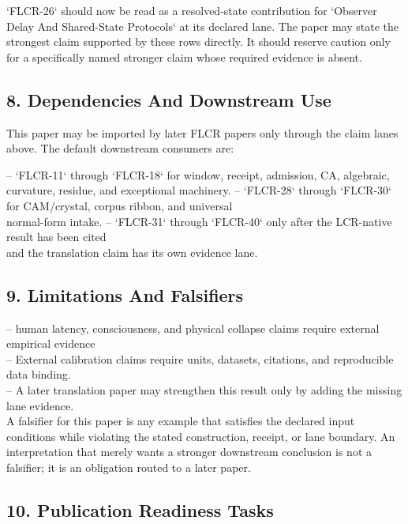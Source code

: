 \documentclass[11pt]{article}
\begin{document}
`FLCR-26` should now be read as a resolved-state contribution for `Observer Delay And Shared-State Protocols` at its declared lane. The paper may state the strongest claim supported by these rows directly. It should reserve caution only for a specifically named stronger claim whose required evidence is absent.

\subsection*{8. Dependencies And Downstream Use}

This paper may be imported by later FLCR papers only through the claim lanes
above. The default downstream consumers are:

\noindent{}-- `FLCR-11` through `FLCR-18` for window, receipt, admission, CA, algebraic,\\
  curvature, residue, and exceptional machinery.
\noindent{}-- `FLCR-28` through `FLCR-30` for CAM/crystal, corpus ribbon, and universal\\
  normal-form intake.
\noindent{}-- `FLCR-31` through `FLCR-40` only after the LCR-native result has been cited\\
  and the translation claim has its own evidence lane.

\subsection*{9. Limitations And Falsifiers}

\noindent{}-- human latency, consciousness, and physical collapse claims require external empirical evidence\\
\noindent{}-- External calibration claims require units, datasets, citations, and reproducible data binding.\\
\noindent{}-- A later translation paper may strengthen this result only by adding the missing lane evidence.\\

A falsifier for this paper is any example that satisfies the declared input
conditions while violating the stated construction, receipt, or lane boundary.
An interpretation that merely wants a stronger downstream conclusion is not a
falsifier; it is an obligation routed to a later paper.

\subsection*{10. Publication Readiness Tasks}
\end{document}
